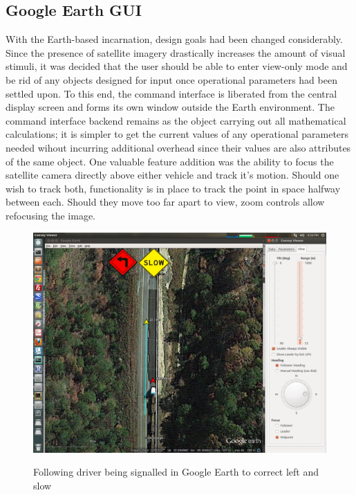 \documentclass[12pt]{report}
\begin{document}
\subsection{Google Earth GUI} \label{sec:finaldes_earth}

With the Earth-based incarnation, design goals had been changed considerably. Since the presence of satellite imagery drastically increases the amount of  visual stimuli, it was decided that the user should be able to enter view-only mode and be rid of any objects designed for input once operational parameters had been settled upon. To this end, the command interface is liberated from the central display screen and forms its own window outside the Earth environment. The command interface backend remains as the object carrying out all mathematical calculations; it is simpler to get the current values of any operational parameters needed wihout incurring additional overhead since their values are also attributes of the same object. One valuable feature addition was the ability to focus the satellite camera directly above either vehicle and track it's motion. Should one wish to track both, functionality is in place to track the point in space halfway between each. Should they move too far apart to view, zoom controls allow refocusing the image.

\begin{figure}[ht] \centering \label{fig:earth_dst}
    \includegraphics[width=5in]{./figs/earth_slow.png}
    \caption{Following driver being signalled in Google Earth to correct left and slow}
\end{figure}
\end{document}
